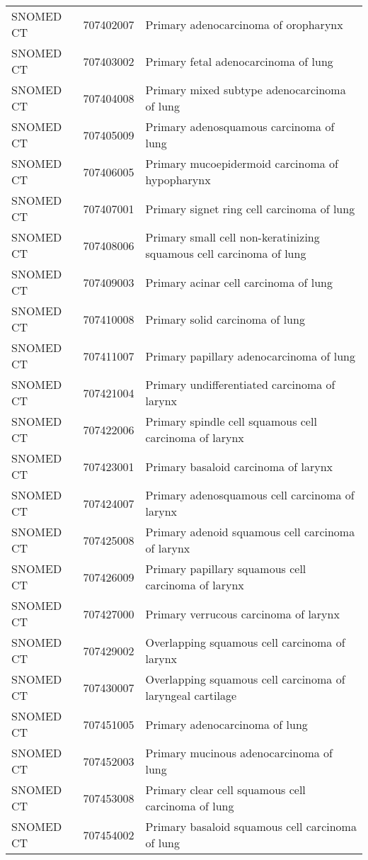 \begin{longtable}{p{}p{}p{}}
  SNOMED CT & 707402007 & Primary adenocarcinoma of oropharynx \\ 
  SNOMED CT & 707403002 & Primary fetal adenocarcinoma of lung \\ 
  SNOMED CT & 707404008 & Primary mixed subtype adenocarcinoma of lung \\ 
  SNOMED CT & 707405009 & Primary adenosquamous carcinoma of lung \\ 
  SNOMED CT & 707406005 & Primary mucoepidermoid carcinoma of hypopharynx \\ 
  SNOMED CT & 707407001 & Primary signet ring cell carcinoma of lung \\ 
  SNOMED CT & 707408006 & Primary small cell non-keratinizing squamous cell carcinoma of lung \\ 
  SNOMED CT & 707409003 & Primary acinar cell carcinoma of lung \\ 
  SNOMED CT & 707410008 & Primary solid carcinoma of lung \\ 
  SNOMED CT & 707411007 & Primary papillary adenocarcinoma of lung \\ 
  SNOMED CT & 707421004 & Primary undifferentiated carcinoma of larynx \\ 
  SNOMED CT & 707422006 & Primary spindle cell squamous cell carcinoma of larynx \\ 
  SNOMED CT & 707423001 & Primary basaloid carcinoma of larynx \\ 
  SNOMED CT & 707424007 & Primary adenosquamous cell carcinoma of larynx \\ 
  SNOMED CT & 707425008 & Primary adenoid squamous cell carcinoma of larynx \\ 
  SNOMED CT & 707426009 & Primary papillary squamous cell carcinoma of larynx \\ 
  SNOMED CT & 707427000 & Primary verrucous carcinoma of larynx \\ 
  SNOMED CT & 707429002 & Overlapping squamous cell carcinoma of larynx \\ 
  SNOMED CT & 707430007 & Overlapping squamous cell carcinoma of laryngeal cartilage \\ 
  SNOMED CT & 707451005 & Primary adenocarcinoma of lung \\ 
  SNOMED CT & 707452003 & Primary mucinous adenocarcinoma of lung \\ 
  SNOMED CT & 707453008 & Primary clear cell squamous cell carcinoma of lung \\ 
  SNOMED CT & 707454002 & Primary basaloid squamous cell carcinoma of lung \\ 

\end{longtable}
